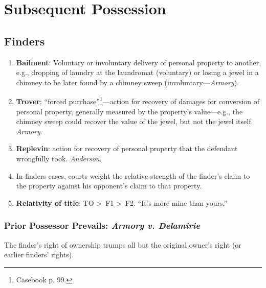 \section{Subsequent Possession}

\subsection{Finders}

\begin{enumerate}
    \item \textbf{Bailment}: Voluntary or involuntary delivery of personal 
    property to another, e.g., dropping of laundry at the laundromat 
    (voluntary) or losing a jewel in a chimney to be later found by a chimney 
    sweep (involuntary---\emph{Armory}).
    \item \textbf{Trover}: ``forced purchase''\footnote{Casebook p. 
    99.}---action for recovery of damages for conversion of personal property, 
    generally measured by the property's value---e.g., the chimney sweep could 
    recover the value of the jewel, but not the jewel itself. \emph{Armory}.
    \item \textbf{Replevin}: action for recovery of personal property that the  
    defendant wrongfully took. \emph{Anderson}.
    \item In finders cases, courts weight the relative strength of the 
    finder's claim to the property against his opponent's claim to that 
    property.
    \item \textbf{Relativity of title}: TO \textgreater\ F1 \textgreater\ F2. 
    ``It's more mine than yours.''
\end{enumerate}

\subsubsection{Prior Possessor Prevails: \emph{Armory v. Delamirie}}

The finder's right of ownership trumps all but the original owner's right (or 
earlier finders' rights).

